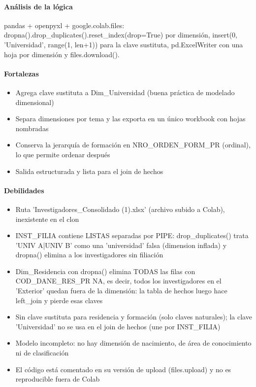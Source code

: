 \paragraph{Análisis de la lógica}
pandas + openpyxl + google.colab.files: dropna().drop\_duplicates().reset\_index(drop=True) por dimensión, insert(0, 'Universidad', range(1, len+1)) para la clave sustituta, pd.ExcelWriter con una hoja por dimensión y files.download().

\paragraph{Fortalezas}
\begin{itemize}
  \item Agrega clave sustituta a Dim\_Universidad (buena práctica de modelado dimensional)
  \item Separa dimensiones por tema y las exporta en un único workbook con hojas nombradas
  \item Conserva la jerarquía de formación en NRO\_ORDEN\_FORM\_PR (ordinal), lo que permite ordenar después
  \item Salida estructurada y lista para el join de hechos
\end{itemize}

\paragraph{Debilidades}
\begin{itemize}
  \item Ruta 'Investigadores\_Consolidado (1).xlsx' (archivo subido a Colab), inexistente en el clon
  \item INST\_FILIA contiene LISTAS separadas por PIPE: drop\_duplicates() trata 'UNIV A|UNIV B' como una 'universidad' falsa (dimension inflada) y dropna() elimina a los investigadores sin filiación
  \item Dim\_Residencia con dropna() elimina TODAS las filas con COD\_DANE\_RES\_PR NA, es decir, todos los investigadores en el 'Exterior' quedan fuera de la dimensión: la tabla de hechos luego hace left\_join y pierde esas claves
  \item Sin clave sustituta para residencia y formación (solo claves naturales); la clave 'Universidad' no se usa en el join de hechos (une por INST\_FILIA)
  \item Modelo incompleto: no hay dimensión de nacimiento, de área de conocimiento ni de clasificación
  \item El código está comentado en su versión de upload (files.upload) y no es reproducible fuera de Colab
\end{itemize}

